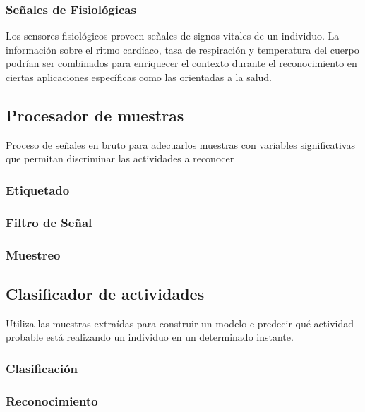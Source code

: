 \subsubsection{Señales de Fisiológicas}

Los sensores fisiológicos proveen señales de signos vitales de un
individuo. La información sobre el ritmo cardíaco, tasa de respiración
y temperatura del cuerpo podrían ser combinados para enriquecer el
contexto durante el reconocimiento en ciertas aplicaciones específicas
como las orientadas a la salud.

\subsection{Procesador de muestras}

\label{sec422:proceso-se=0000F1ales}Proceso de señales en bruto para
adecuarlos muestras con variables significativas que permitan discriminar
las actividades a reconocer

\subsubsection{Etiquetado}

\subsubsection{Filtro de Señal}

\subsubsection{Muestreo}

\subsection{Clasificador de actividades}

\label{sec423:clasificador}Utiliza las muestras extraídas para construir
un modelo e predecir qué actividad probable está realizando un individuo
en un determinado instante.

\subsubsection{Clasificación}

\subsubsection{Reconocimiento}

